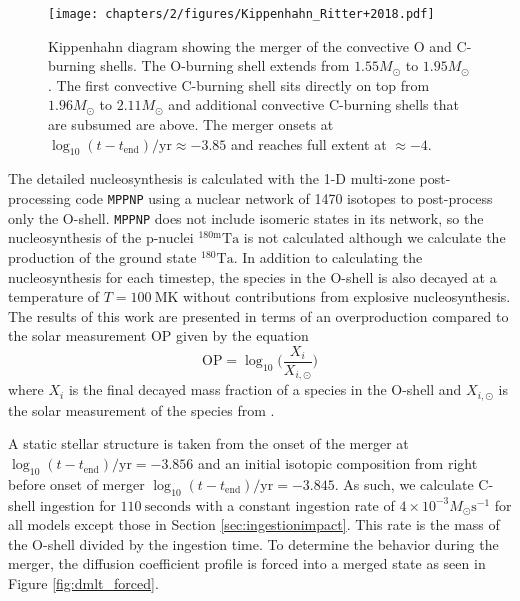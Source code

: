 \begin{figure}[!htbp]
\texttt{[image: chapters/2/figures/Kippenhahn\_Ritter+2018.pdf]}
\caption{Kippenhahn diagram showing the merger of the convective O and C-burning shells. The O-burning shell extends from $1.55 M_\odot$ to $1.95 M_\odot$. The first convective C-burning shell sits directly on top from $1.96 M_\odot$ to $2.11 M_\odot$ and additional convective C-burning shells that are subsumed are above. The merger onsets at $\log_{10}(t-t_{\mathrm{end}}) /\mathrm{yr} \approx -3.85$ and reaches full extent at $\approx-4$.
\label{fig:kippenhahn}}
\end{figure}

The detailed nucleosynthesis is calculated with the 1-D multi-zone post-processing code \texttt{MPPNP} using a nuclear network of 1470 isotopes to post-process only the O-shell.
\texttt{MPPNP} does not include isomeric states in its network, so the nucleosynthesis of the p-nuclei $^{180\mathrm{m}}\mathrm{Ta}$ is not calculated although we calculate the production of the ground state $^{180}\mathrm{Ta}$. 
In addition to calculating the nucleosynthesis for each timestep, the species in the O-shell is also decayed at a temperature of $T=100~\mathrm{MK}$ without contributions from explosive nucleosynthesis.
The results of this work are presented in terms of an overproduction compared to the solar measurement $\mathrm{OP}$ given by the equation
$$\mathrm{OP} = \log_{10}\Biggl(\frac{X_{i}}{X_{i,\odot}}\Biggr)$$
where $X_{i}$ is the final decayed mass fraction of a species in the O-shell and $X_{i,\odot}$ is the solar measurement of the species from \cite{grevesseAtomicDataSolar1994}.

A static stellar structure is taken from the onset of the merger at $\log_{10}(t-t_{\mathrm{end}}) /\mathrm{yr}=-3.856$ and an initial isotopic composition from right before onset of merger $\log_{10}(t-t_{\mathrm{end}}) /\mathrm{yr}=-3.845$.
As such, we calculate C-shell ingestion for $110 \mathrm{~seconds}$ with a constant ingestion rate of $4\times10^{-3} M_\odot\mathrm{s^{-1}}$ for all models except those in Section \ref{sec:ingestionimpact}. 
This rate is the mass of the O-shell divided by the ingestion time.
To determine the behavior during the merger, the diffusion coefficient profile is forced into a merged state as seen in Figure \ref{fig:dmlt_forced}. 

